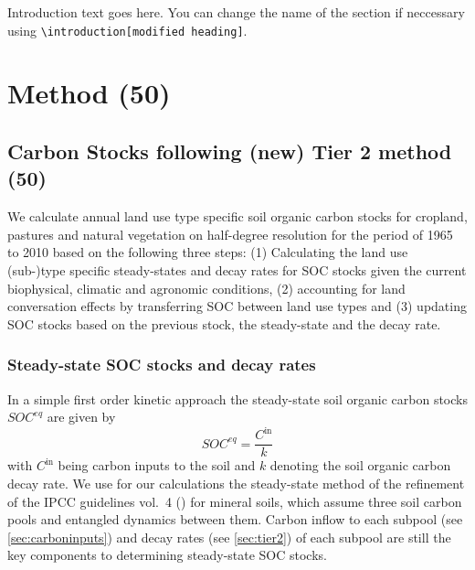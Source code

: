 \documentclass[gc, manuscript]{copernicus}
\begin{document}


\newpage

\introduction

Introduction text goes here.
You can change the name of the section if neccessary using \texttt{\textbackslash{}introduction{[}modified\ heading{]}}.
\newpage

\hypertarget{method-50}{%
\section{Method (50)}\label{method-50}}

\hypertarget{sec:carbonbudget}{%
\subsection{Carbon Stocks following (new) Tier 2 method (50)}\label{sec:carbonbudget}}

We calculate annual land use type specific soil organic carbon stocks for cropland, pastures and natural vegetation on half-degree resolution for the period of 1965 to 2010 based on the following three steps: (1) Calculating the land use (sub-)type specific steady-states and decay rates for SOC stocks given the current biophysical, climatic and agronomic conditions, (2) accounting for land conversation effects by transferring SOC between land use types and (3) updating SOC stocks based on the previous stock, the steady-state and the decay rate.

\hypertarget{steady-state-soc-stocks-and-decay-rates}{%
\subsubsection{Steady-state SOC stocks and decay rates}\label{steady-state-soc-stocks-and-decay-rates}}

In a simple first order kinetic approach the steady-state soil organic carbon stocks \(SOC^{eq}\) are given by
\begin{equation}
SOC^{eq} =\frac{C^{\textrm{in}}}{k}
\label{eq:inoutflow}
\end{equation}
with \(C^{\textrm{in}}\) being carbon inputs to the soil and \(k\) denoting the soil organic carbon decay rate. We use for our calculations the steady-state method of the refinement of the IPCC guidelines vol.~4 (\citet{ipcc_2019_2019}) for mineral soils, which assume three soil carbon pools and entangled dynamics between them. Carbon inflow to each subpool (see \ref{sec:carboninputs}) and decay rates (see \ref{sec:tier2}) of each subpool are still the key components to determining steady-state SOC stocks.
\end{document}

